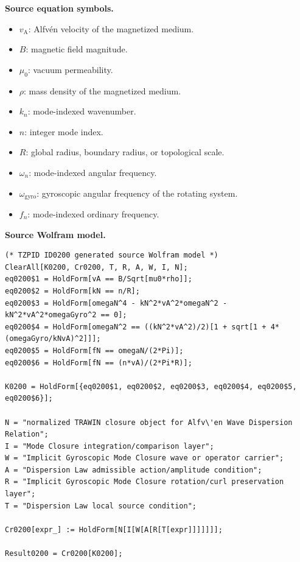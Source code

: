 \begin{minipage}[t]{0.49\linewidth}
\begingroup
\small
\raggedright
\textbf{Source equation symbols.}\par
\begin{itemize}[leftmargin=1.35em,itemsep=1pt,topsep=1pt,parsep=0pt]
    \item $v_{\mathrm{A}}$: Alfv\'en velocity of the magnetized medium.
    \item $B$: magnetic field magnitude.
    \item $\mu_0$: vacuum permeability.
    \item $\rho$: mass density of the magnetized medium.
    \item $k_n$: mode-indexed wavenumber.
    \item $n$: integer mode index.
    \item $R$: global radius, boundary radius, or topological scale.
    \item $\omega_n$: mode-indexed angular frequency.
    \item $\omega_{\mathrm{gyro}}$: gyroscopic angular frequency of the rotating system.
    \item $f_n$: mode-indexed ordinary frequency.
\end{itemize}
\endgroup
\end{minipage}\hfill
\begin{minipage}[t]{0.47\linewidth}
\begingroup
\scriptsize
\raggedright
\textbf{Source Wolfram model.}\par
\begin{Verbatim}[fontsize=\tiny,breaklines=true,breakanywhere=true]
(* TZPID ID0200 generated source Wolfram model *)
ClearAll[K0200, Cr0200, T, R, A, W, I, N];
eq0200$1 = HoldForm[vA == B/Sqrt[mu0*rho]];
eq0200$2 = HoldForm[kN == n/R];
eq0200$3 = HoldForm[omegaN^4 - kN^2*vA^2*omegaN^2 - kN^2*vA^2*omegaGyro^2 == 0];
eq0200$4 = HoldForm[omegaN^2 == ((kN^2*vA^2)/2)[1 + sqrt[1 + 4*(omegaGyro/kNvA)^2]]];
eq0200$5 = HoldForm[fN == omegaN/(2*Pi)];
eq0200$6 = HoldForm[fN == (n*vA)/(2*Pi*R)];

K0200 = HoldForm[{eq0200$1, eq0200$2, eq0200$3, eq0200$4, eq0200$5, eq0200$6}];

N = "normalized TRAWIN closure object for Alfv\'en Wave Dispersion Relation";
I = "Mode Closure integration/comparison layer";
W = "Implicit Gyroscopic Mode Closure wave or operator carrier";
A = "Dispersion Law admissible action/amplitude condition";
R = "Implicit Gyroscopic Mode Closure rotation/curl preservation layer";
T = "Dispersion Law local source condition";

Cr0200[expr_] := HoldForm[N[I[W[A[R[T[expr]]]]]]];

Result0200 = Cr0200[K0200];
\end{Verbatim}
\endgroup
\end{minipage}

